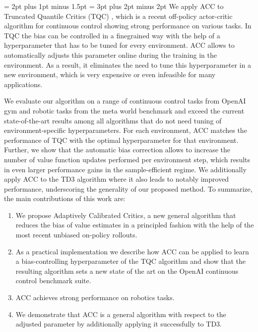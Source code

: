 {\spaceskip= 2pt plus 1pt minus 1.5pt  \spaceskip= 3pt plus 2pt minus 2pt We apply ACC to Truncated Quantile Critics (TQC) \cite{tqc}, which is a recent off-policy actor-critic algorithm for continuous control showing strong performance on various tasks. 
In TQC the bias can be controlled in a finegrained way with the help of a hyperparameter that has to be tuned for every environment.
ACC allows to automatically adjusts this parameter online during the training in the environment.
As a result, it eliminates the need to tune this hyperparameter in a new environment, which is very expensive or even infeasible for many applications.}

We evaluate our algorithm on a range of continuous control tasks from OpenAI gym \cite{gymopenai} and robotic tasks from the meta world benchmark \cite{yu2020meta} and exceed the current state-of-the-art results among all algorithms that do not need  tuning of environment-specific hyperparameters.
For each environment, ACC matches the performance of TQC with the optimal hyperparameter for that environment.
Further, we show that the automatic bias correction allows to increase the number of value function updates performed per environment step, which results in even larger performance gains in the sample-efficient regime.
We additionally apply ACC to the TD3 algorithm \cite{td3} where it also leads to notably improved performance, underscoring the generality of our proposed method.
To summarize, the main contributions of this work are:
\begin{enumerate}[leftmargin=0.72cm]
    \item We propose Adaptively Calibrated Critics, a new general algorithm  that reduces the bias of value estimates in a principled fashion with the help of the most recent unbiased on-policy rollouts.
    \item As a practical implementation we describe how ACC can be applied to learn a bias-controlling hyperparameter of the TQC algorithm and show that the resulting algorithm sets a new state of the art on the OpenAI continuous control benchmark suite.
    \item ACC achieves strong performance on robotics tasks.
    \item We demonstrate that ACC is a general algorithm with respect to the adjusted parameter by additionally applying it successfully to TD3.
\end{enumerate}

